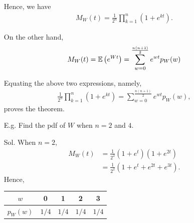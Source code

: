 \begin{frame}[fragile]
\begin{itemize}
	\item[] Hence, we have
	\begin{align*}
		M_W(t) =\frac{1}{2^n}\prod_{k=1}^n\left(1+e^{kt}\right).
	\end{align*}
	\item[] On the other hand,
	\begin{align*}
		M_W(t) = \mathbb{E}\left(e^{Wt}\right) = \sum_{w=0}^{\frac{n(n+1)}{2}} e^{wt} p_W(w)
	\end{align*}
	\item[] Equating the above two expressions, namely,
	\begin{align*}
		\frac{1}{2^n}\prod_{k=1}^n\left(1+e^{kt}\right) = \sum_{w=0}^{\frac{n(n+1)}{2}} e^{wt} p_W(w),
	\end{align*}
	proves the theorem.\myQED
\end{itemize}
\end{frame}
\begin{frame}[fragile]
\begin{itemize}
	\item[E.g.] Find the pdf of $W$ when $n=2$ and $4$.
	\bigskip

	\item[Sol.] When $n=2$,
	 \begin{align*}
		M_W(t) & = \frac{1}{2^2} \left(1+e^t\right)\left(1+e^{2t}\right)\\
           & = \frac{1}{2^2} (1+e^t+e^{2t}+e^{3t}).
	\end{align*}
	Hence,
	\begin{center}
		\renewcommand{\arraystretch}{1.5}
		\begin{tabular}{|c|c|c|c|c|}
			$w$      & 0 & 1 & 2 & 3 \\\hline
			$p_W(w)$ & $1/4$ & $1/4$ & $1/4$ & $1/4$
		\end{tabular}
	\end{center}
\end{itemize}
\end{frame}
